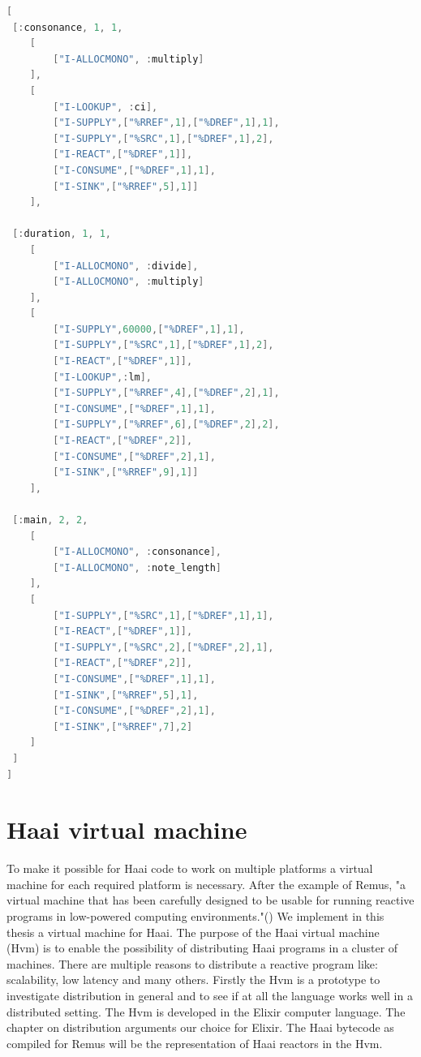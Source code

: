 \documentclass[a4paper]{book}
\begin{document}
\begin{lstlisting}[language=C, caption={Parsed remus bytecode code}, label={code:bytecode}, basicstyle=\ttfamily, frame=single]
[
 [:consonance, 1, 1,
	[
		["I-ALLOCMONO", :multiply]
	],
	[
		["I-LOOKUP", :ci],
		["I-SUPPLY",["%RREF",1],["%DREF",1],1],
		["I-SUPPLY",["%SRC",1],["%DREF",1],2],
		["I-REACT",["%DREF",1]],
		["I-CONSUME",["%DREF",1],1],
		["I-SINK",["%RREF",5],1]]
	],

 [:duration, 1, 1,
	[
		["I-ALLOCMONO", :divide],
		["I-ALLOCMONO", :multiply]
	],
	[
		["I-SUPPLY",60000,["%DREF",1],1],
		["I-SUPPLY",["%SRC",1],["%DREF",1],2],
		["I-REACT",["%DREF",1]],
		["I-LOOKUP",:lm],
		["I-SUPPLY",["%RREF",4],["%DREF",2],1],
		["I-CONSUME",["%DREF",1],1],
		["I-SUPPLY",["%RREF",6],["%DREF",2],2],
		["I-REACT",["%DREF",2]],
		["I-CONSUME",["%DREF",2],1],
		["I-SINK",["%RREF",9],1]]
	],

 [:main, 2, 2,
	[
		["I-ALLOCMONO", :consonance],
		["I-ALLOCMONO", :note_length]
	],
	[
		["I-SUPPLY",["%SRC",1],["%DREF",1],1],
		["I-REACT",["%DREF",1]],
		["I-SUPPLY",["%SRC",2],["%DREF",2],1],
		["I-REACT",["%DREF",2]],
		["I-CONSUME",["%DREF",1],1],
		["I-SINK",["%RREF",5],1],
		["I-CONSUME",["%DREF",2],1],
		["I-SINK",["%RREF",7],2]
	]
 ]
]
\end{lstlisting}

\chapter{Haai virtual machine} \label{sec:Hvm}
To make it possible for Haai code to work on multiple platforms a virtual machine for each required platform is necessary. After the example of Remus, "a virtual machine that has been carefully designed to be usable for running reactive programs in low-powered computing environments."(\cite{oeyen_remus_2022}) We implement in this thesis a virtual machine for Haai. The purpose of the Haai virtual machine (Hvm) is to enable the possibility of distributing Haai programs in a cluster of machines. There are multiple reasons to distribute a reactive program like: scalability, low latency and many others. Firstly the Hvm is a prototype to investigate distribution in general and to see if at all the language works well in a distributed setting. The Hvm is developed  in the Elixir computer language. The chapter on distribution arguments our choice for Elixir. The Haai bytecode as compiled for Remus will be the representation of Haai reactors in the Hvm. 
\end{document}
